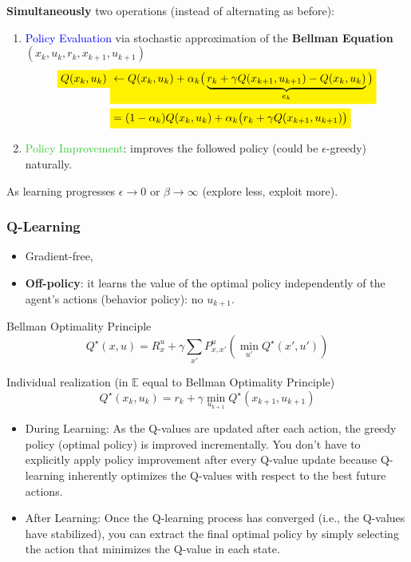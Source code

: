 \begin{tcolorbox}[colframe=cyan!50!black, colback=cyan!5!white, title=SARSA (conceptually similar to Policy Iteration)]
\textbf{Simultaneously} two operations (instead of alternating as before):
\begin{enumerate}
    \item \textcolor{blue}{Policy Evaluation} via \textcolor{BurntOrange}{stochastic approximation} of the \textbf{Bellman Equation} $(x_k, u_k, r_k, x_{k+1}, u_{k+1})$
    \begin{align*}
        \stabilo{Q(x_k, u_k)} &\stabilo{\gets Q(x_k, u_k) + \alpha_k \big( \underbrace{r_k + \gamma Q(x_{k+1}, u_{k+1}) - Q(x_k, u_k)}_{e_k} \big)} \\
        &\stabilo{= (1 - \alpha_k) Q(x_k, u_k) + \alpha_k \big( r_k + \gamma Q(x_{k+1}, u_{k+1}) \big)}
    \end{align*}
    \item \textcolor{LimeGreen}{Policy Improvement}: improves the followed policy (could be $\epsilon$-greedy) naturally.
\end{enumerate}
As learning progresses $\epsilon \rightarrow 0$ or $\beta \rightarrow \infty$ (explore less, exploit more).
\end{tcolorbox}

\subsubsection{Q-Learning}
\begin{itemize}
    \item Gradient-free, 
    \item \textbf{Off-policy}: it learns the value of the optimal policy independently of the agent's actions (behavior policy): no $u_{k+1}$.
\end{itemize}

\begin{minipage}{0.43\textwidth}
    Bellman Optimality Principle
    \[
    Q^\star(x, u) = R^u_x + \gamma \sum_{x'} P^u_{x,x'} \left( \min_{u'} Q^\star(x', u') \right)
    \] 
\end{minipage}
\begin{minipage}{0.53\textwidth}
    Individual realization (in $\mathbb{E}$ equal to Bellman Optimality Principle)
    \[
    Q^\star(x_k, u_k) = r_k + \gamma \min_{u_{k+1}} Q^\star(x_{k+1}, u_{k+1})
    \]
\end{minipage}

\begin{itemize}
    \item During Learning: As the Q-values are updated after each action, the greedy policy (optimal policy) is improved incrementally. You don’t have to explicitly apply policy improvement after every Q-value update because Q-learning inherently optimizes the Q-values with respect to the best future actions.
    \item After Learning: Once the Q-learning process has converged (i.e., the Q-values have stabilized), you can extract the final optimal policy by simply selecting the action that minimizes the Q-value in each state.
\end{itemize}

